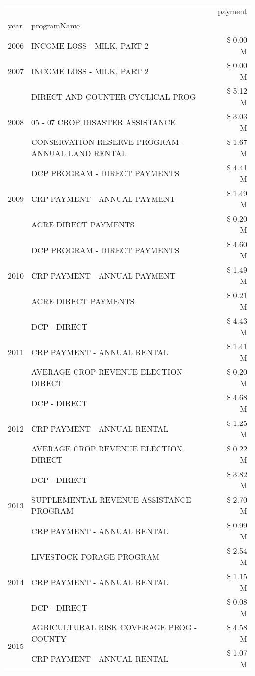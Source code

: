 \begin{tabular}{llr}
\toprule
 &  & payment \\
year & programName &  \\
\midrule
2006 & INCOME LOSS - MILK, PART 2 & \$ 0.00 M \\
\cline{1-3}
2007 & INCOME LOSS - MILK, PART 2 & \$ 0.00 M \\
\cline{1-3}
\multirow[t]{3}{*}{2008} & DIRECT AND COUNTER CYCLICAL PROG & \$ 5.12 M \\
 & 05 - 07 CROP DISASTER ASSISTANCE & \$ 3.03 M \\
 & CONSERVATION RESERVE PROGRAM - ANNUAL LAND RENTAL & \$ 1.67 M \\
\cline{1-3}
\multirow[t]{3}{*}{2009} & DCP PROGRAM - DIRECT PAYMENTS & \$ 4.41 M \\
 & CRP PAYMENT - ANNUAL PAYMENT & \$ 1.49 M \\
 & ACRE DIRECT PAYMENTS & \$ 0.20 M \\
\cline{1-3}
\multirow[t]{3}{*}{2010} & DCP PROGRAM - DIRECT PAYMENTS & \$ 4.60 M \\
 & CRP PAYMENT - ANNUAL PAYMENT & \$ 1.49 M \\
 & ACRE DIRECT PAYMENTS & \$ 0.21 M \\
\cline{1-3}
\multirow[t]{3}{*}{2011} & DCP - DIRECT & \$ 4.43 M \\
 & CRP PAYMENT - ANNUAL RENTAL & \$ 1.41 M \\
 & AVERAGE CROP REVENUE ELECTION-DIRECT & \$ 0.20 M \\
\cline{1-3}
\multirow[t]{3}{*}{2012} & DCP - DIRECT & \$ 4.68 M \\
 & CRP PAYMENT - ANNUAL RENTAL & \$ 1.25 M \\
 & AVERAGE CROP REVENUE ELECTION-DIRECT & \$ 0.22 M \\
\cline{1-3}
\multirow[t]{3}{*}{2013} & DCP - DIRECT & \$ 3.82 M \\
 & SUPPLEMENTAL REVENUE ASSISTANCE PROGRAM & \$ 2.70 M \\
 & CRP PAYMENT - ANNUAL RENTAL & \$ 0.99 M \\
\cline{1-3}
\multirow[t]{3}{*}{2014} & LIVESTOCK FORAGE PROGRAM & \$ 2.54 M \\
 & CRP PAYMENT - ANNUAL RENTAL & \$ 1.15 M \\
 & DCP - DIRECT & \$ 0.08 M \\
\cline{1-3}
\multirow[t]{3}{*}{2015} & AGRICULTURAL RISK COVERAGE PROG - COUNTY & \$ 4.58 M \\
 & CRP PAYMENT - ANNUAL RENTAL & \$ 1.07 M \\

\end{tabular}
